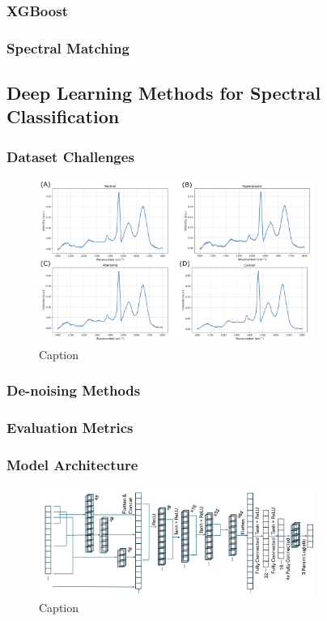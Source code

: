 \subsubsection{XGBoost}
\subsubsection{Spectral Matching}


\subsection{Deep Learning Methods for Spectral Classification}
\subsubsection{Dataset Challenges}
\begin{figure}[htbp]
  \centering
  \includegraphics[width=0.8\textwidth]{Images/Dataset_Class_Differences.png}
  \caption{Caption}
  \label{fig:my-label}
\end{figure}

\subsubsection{De-noising Methods}
\subsubsection{Evaluation Metrics}

\subsubsection{Model Architecture}
\begin{figure}[htbp]
  \centering
  \includegraphics[width=0.8\textwidth]{Images/SCNN_TPL_Arch.png}
  \caption{Caption}
  \label{fig:my-label}
\end{figure}

